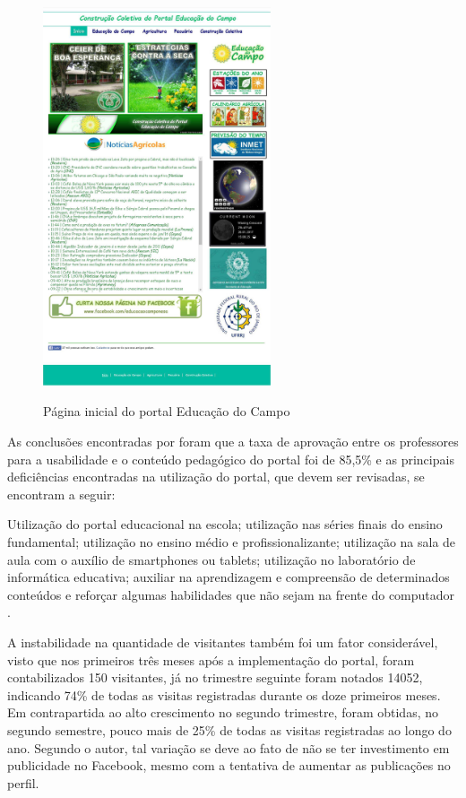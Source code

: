 \begin{figure}[htb]
 \centering
 \caption{Página inicial do portal Educação do Campo}
 \includegraphics[width=0.6\textwidth]{figuras/pInicial-Centro}
 \label{pagina-inicial-portal}
\end{figure}

\newpage

As conclusões encontradas por  foram que a taxa de aprovação entre os professores para a usabilidade e o conteúdo pedagógico do portal foi de 85,5\% e as principais deficiências encontradas na utilização do portal, que devem ser revisadas, se encontram a seguir:

\begin{citacao}
 Utilização do portal educacional na escola; utilização nas séries finais do ensino fundamental; utilização no ensino médio e profissionalizante; utilização na sala de aula com o auxílio de smartphones ou tablets; utilização no laboratório de
informática educativa; auxiliar na aprendizagem e compreensão de determinados conteúdos e reforçar algumas habilidades que não sejam na frente do computador \cite{soares2017construccao}. 
\end{citacao}

A instabilidade na quantidade de visitantes também foi um fator considerável, visto que nos primeiros três meses após a implementação do portal, foram contabilizados 150 visitantes, já no trimestre seguinte foram notados 14052, indicando 74\% de todas as visitas registradas durante os doze primeiros meses. Em contrapartida ao alto crescimento no segundo trimestre, foram obtidas, no segundo semestre, pouco mais de 25\% de todas as visitas registradas ao longo do ano. Segundo o autor, tal variação se deve ao fato de não se ter investimento em publicidade no Facebook, mesmo com a tentativa de aumentar as publicações no perfil.



